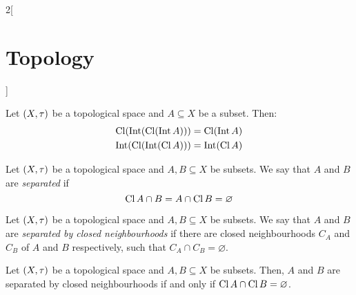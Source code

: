 \documentclass[../../../main.tex]{subfiles}
\begin{document}
\begin{multicols}{2}[\section{Topology}]
    \begin{prop}
        Let $(X,\tau)$ be a topological space and $A\subseteq X$ be a subset. Then:
        \begin{gather*}
            \operatorname{Cl}(\operatorname{Int}(\operatorname{Cl}(\operatorname{Int} A)))=\operatorname{Cl}(\operatorname{Int} A)\\
            \operatorname{Int}(\operatorname{Cl}(\operatorname{Int} (\operatorname{Cl} A)))=\operatorname{Int}(\operatorname{Cl} A)
        \end{gather*}
    \end{prop}
    \begin{definition}
        Let $(X,\tau)$ be a topological space and $A,B\subseteq X$ be subsets. We say that $A$ and $B$ are \emph{separated} if $$\operatorname{Cl} A\cap B=A\cap\operatorname{Cl} B=\varnothing$$
    \end{definition}
    \begin{definition}
        Let $(X,\tau)$ be a topological space and $A,B\subseteq X$ be subsets. We say that $A$ and $B$ are \emph{separated by closed neighbourhoods} if there are closed neighbourhoods $C_A$ and $C_B$ of $A$ and $B$ respectively, such that $C_A\cap C_B=\varnothing$.
    \end{definition}
    \begin{prop}
        Let $(X,\tau)$ be a topological space and $A,B\subseteq X$ be subsets. Then, $A$ and $B$ are separated by closed neighbourhoods if and only if $\operatorname{Cl} A\cap\operatorname{Cl} B=\varnothing$.
    \end{prop}

\end{multicols}
\end{document}
